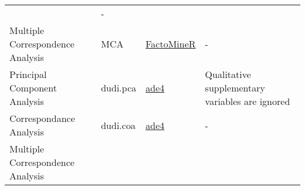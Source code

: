 \documentclass[]{article}
\begin{document}
\begin{longtable}[]{@{}llll@{}}
\begin{minipage}[t]{0.14\columnwidth}
\end{minipage} & \begin{minipage}[t]{0.11\columnwidth}\raggedright
-\strut
\end{minipage}\tabularnewline
\begin{minipage}[t]{0.17\columnwidth}\raggedright
Multiple Correspondence Analysis\strut
\end{minipage} & \begin{minipage}[t]{0.17\columnwidth}\raggedright
MCA\strut
\end{minipage} & \begin{minipage}[t]{0.14\columnwidth}\raggedright
\href{http://factominer.free.fr/}{FactoMineR}\strut
\end{minipage} & \begin{minipage}[t]{0.11\columnwidth}\raggedright
-\strut
\end{minipage}\tabularnewline
\begin{minipage}[t]{0.17\columnwidth}\raggedright
Principal Component Analysis\strut
\end{minipage} & \begin{minipage}[t]{0.17\columnwidth}\raggedright
dudi.pca\strut
\end{minipage} & \begin{minipage}[t]{0.14\columnwidth}\raggedright
\href{https://cran.r-project.org/package=ade4}{ade4}\strut
\end{minipage} & \begin{minipage}[t]{0.11\columnwidth}\raggedright
Qualitative supplementary variables are ignored\strut
\end{minipage}\tabularnewline
\begin{minipage}[t]{0.17\columnwidth}\raggedright
Correspondance Analysis\strut
\end{minipage} & \begin{minipage}[t]{0.17\columnwidth}\raggedright
dudi.coa\strut
\end{minipage} & \begin{minipage}[t]{0.14\columnwidth}\raggedright
\href{https://cran.r-project.org/package=ade4}{ade4}\strut
\end{minipage} & \begin{minipage}[t]{0.11\columnwidth}\raggedright
-\strut
\end{minipage}\tabularnewline
\begin{minipage}[t]{0.17\columnwidth}\raggedright
Multiple Correspondence Analysis\strut
\end{minipage} & \begin{minipage}[t]{0.17\columnwidth}\raggedright

\end{minipage}
\end{longtable}
\end{document}
